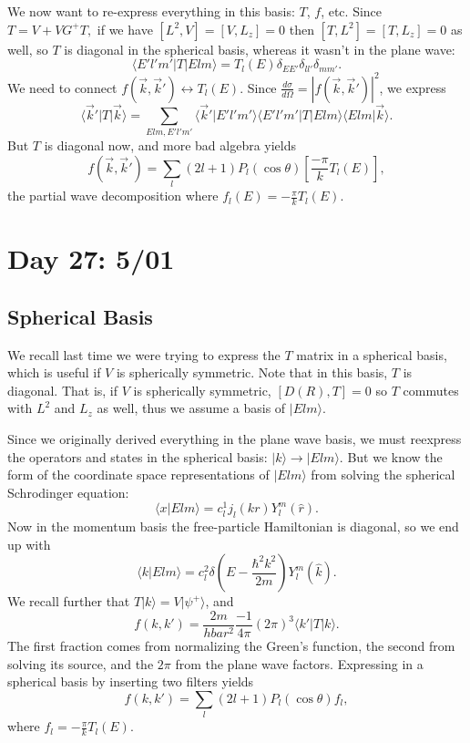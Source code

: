 \documentclass[fontsize=12pt]{scrartcl}
\newcommand{\la}{\langle}
\newcommand{\ra}{\rangle}
\begin{document}
We now want to re-express everything in this basis: $T$, $f$, etc. Since $T=V+VG^+T,$ if we have $[L^2,V]=[V,L_z]=0$ then $[T, L^2]=[T,L_z]=0$ as well, so $T$ is diagonal in the spherical basis, whereas it wasn't in the plane wave: $$\la E'l'm'|T|Elm\ra = T_l(E)\delta_{EE'}\delta_{ll'}\delta_{mm'}.$$ We need to connect $f(\vec{k},\vec{k}')\leftrightarrow T_l(E)$. Since $\frac{d\sigma}{d\Omega}=|f(\vec{k},\vec{k}')|^2$, we express $$\la \vec{k}'|T|\vec{k}\ra = \sum_{Elm, E'l'm'} \la \vec{k}'|E'l'm'\ra \la E'l'm' |T|Elm\ra \la Elm|\vec{k}\ra.$$ But $T$ is diagonal now, and more bad algebra yields $$f(\vec{k},\vec{k}') = \sum_l (2l+1)P_l(\cos\theta)\left[\frac{-\pi}{k}T_l(E)\right],$$ the partial wave decomposition where $f_l(E)=-\frac{\pi}{k}T_l(E).$



\section{Day 27: 5/01}

\subsection{Spherical Basis}

We recall last time we were trying to express the $T$ matrix in a spherical basis, which is useful if $V$ is spherically symmetric. Note that in this basis, $T$ is diagonal. That is, if $V$ is spherically symmetric, $[D(R),T]=0$ so $T$ commutes with $L^2$ and $L_z$ as well, thus we assume a basis of $|Elm\ra$.

Since we originally derived everything in the plane wave basis, we must reexpress the operators and states in the spherical basis: $|k\ra \to |Elm\ra$. But we know the form of the coordinate space representations of $|Elm\ra$ from solving the spherical Schrodinger equation: $$\la x|Elm\ra = c_l^1 j_l(kr) Y_l^m(\hat{r}).$$ Now in the momentum basis the free-particle Hamiltonian is diagonal, so we end up with $$\la k|Elm\ra = c_l^2 \delta\left(E-\frac{\hbar^2k^2}{2m}\right)Y_l^m(\hat{k}).$$ We recall further that $T|k\ra = V|\psi^+\ra$, and $$f(k, k') = \frac{2m}{
hbar^2} \frac{-1}{4\pi} (2\pi)^3 \la k'|T|k\ra.$$ The first fraction comes from normalizing the Green's function, the second from solving its source, and the $2\pi$ from the plane wave factors. Expressing in a spherical basis by inserting two filters yields $$f(k, k') = \sum_l (2l+1) P_l(\cos\theta) f_l,$$ where $f_l = -\frac{\pi}{k}T_l(E).$ 
\end{document}
